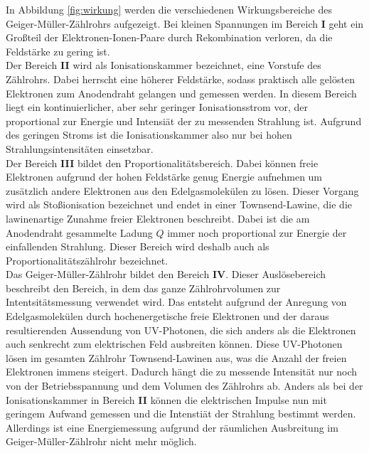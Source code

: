 In Abbildung \ref{fig:wirkung} werden die verschiedenen Wirkungsbereiche des Geiger-Müller-Zählrohrs aufgezeigt.
Bei kleinen Spannungen im Bereich \textbf{I} geht ein Großteil der Elektronen-Ionen-Paare durch Rekombination verloren, da die Feldstärke zu gering ist. \\
Der Bereich \textbf{II} wird als Ionisationskammer bezeichnet, eine Vorstufe des Zählrohrs.
Dabei herrscht eine höherer Feldstärke, sodass praktisch alle gelösten Elektronen zum Anodendraht gelangen und gemessen werden.
In diesem Bereich liegt ein kontinuierlicher, aber sehr geringer Ionisationsstrom vor, der proportional zur Energie und Intensiät der zu messenden Strahlung ist.
Aufgrund des geringen Stroms ist die Ionisationskammer also nur bei hohen Strahlungsintensitäten einsetzbar. \\
Der Bereich \textbf{III} bildet den Proportionalitätsbereich.
Dabei können freie Elektronen aufgrund der hohen Feldstärke genug Energie aufnehmen um zusätzlich andere Elektronen aus den Edelgasmolekülen zu lösen.
Dieser Vorgang wird als Sto\ss{}ionisation bezeichnet und endet in einer Townsend-Lawine, die die lawinenartige Zunahme freier Elektronen beschreibt.
Dabei ist die am Anodendraht gesammelte Ladung $Q$ immer noch proportional zur Energie der einfallenden Strahlung.
Dieser Bereich wird deshalb auch als Proportionalitätszählrohr bezeichnet.\\
Das Geiger-Müller-Zählrohr bildet den Bereich \textbf{IV}.
Dieser Auslösebereich beschreibt den Bereich, in dem das ganze Zählrohrvolumen zur Intentsitätsmessung verwendet wird.
Das entsteht aufgrund der Anregung von Edelgasmolekülen durch hochenergetische freie Elektronen und der daraus resultierenden Aussendung von UV-Photonen, die sich anders als die Elektronen auch senkrecht zum elektrischen Feld ausbreiten können.
Diese UV-Photonen lösen im gesamten Zählrohr Townsend-Lawinen aus, was die Anzahl der freien Elektronen immens steigert.
Dadurch hängt die zu messende Intensität nur noch von der Betriebsspannung und dem Volumen des Zählrohrs ab.
Anders als bei der Ionisationskammer in Bereich \textbf{II} können die elektrischen Impulse nun mit geringem Aufwand gemessen und die Intenstiät der Strahlung bestimmt werden.
Allerdings ist eine Energiemessung aufgrund der räumlichen Ausbreitung im Geiger-Müller-Zählrohr nicht mehr möglich.

